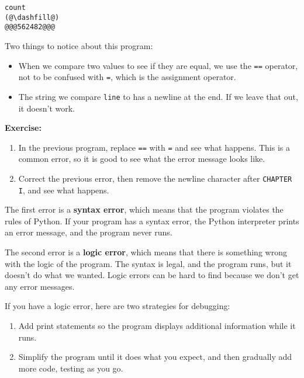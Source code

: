 \begin{lstlisting}[]
count
(@\dashfill@)
@@@562482@@@
\end{lstlisting}

Two things to notice about this program:

\begin{itemize}
\item
  When we compare two values to see if they are equal, we use the
  \passthrough{\lstinline!==!} operator, not to be confused with
  \passthrough{\lstinline!=!}, which is the assignment operator.
\item
  The string we compare \passthrough{\lstinline!line!} to has a newline
  at the end. If we leave that out, it doesn't work.
\end{itemize}

\textbf{Exercise:}

\begin{enumerate}
\def\labelenumi{\arabic{enumi}.}
\item
  In the previous program, replace \passthrough{\lstinline!==!} with
  \passthrough{\lstinline!=!} and see what happens. This is a common
  error, so it is good to see what the error message looks like.
\item
  Correct the previous error, then remove the newline character after
  \passthrough{\lstinline!CHAPTER I!}, and see what happens.
\end{enumerate}

The first error is a \textbf{syntax error}, which means that the program
violates the rules of Python. If your program has a syntax error, the
Python interpreter prints an error message, and the program never runs.

The second error is a \textbf{logic error}, which means that there is
something wrong with the logic of the program. The syntax is legal, and
the program runs, but it doesn't do what we wanted. Logic errors can be
hard to find because we don't get any error messages.

If you have a logic error, here are two strategies for debugging:

\begin{enumerate}
\def\labelenumi{\arabic{enumi}.}
\item
  Add print statements so the program displays additional information
  while it runs.
\item
  Simplify the program until it does what you expect, and then gradually
  add more code, testing as you go.
\end{enumerate}


